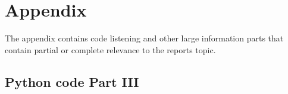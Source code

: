 \section{Appendix} \label{sec: Appendix}
The appendix contains code listening and other large information parts that contain partial or complete relevance to the reports topic. 
\subsection{Python code Part III} \label{subsec: C code}


